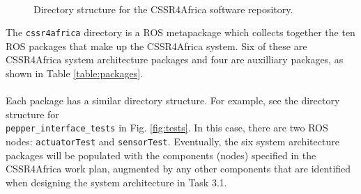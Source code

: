 \documentclass{CSSRforAfrica}
\newcommand{\blank}{~\\}
\begin{document}
\begin{appendices}
\begin{figure}[th]
\begin{multicols}{3}
\columnbreak

~~~~~~~~~~~~~~~~~~~~~

\end{multicols}
\caption{Directory structure for the CSSR4Africa software repository.}
\label{fig:directory_structure}       
\end{figure}

\noindent The {\small \verb+cssr4africa+} directory is a ROS metapackage which collects together the ten ROS packages that make up the CSSR4Africa system. Six of these are CSSR4Africa system architecture packages and four are auxilliary packages, as shown in Table \ref{table:packages}.
\blank
~
\blank
Each package has a similar directory structure. For example, see the directory structure for \\
{\small \verb+pepper_interface_tests+} in Fig. \ref{fig:tests}.  In this case, there are two ROS nodes: {\small \verb+actuatorTest+} and {\small \verb+sensorTest+}.  Eventually, the six system architecture packages will be populated with the components (nodes) specified in the CSSR4Africa work plan, augmented by any other components that are identified when designing the system architecture in Task 3.1.



\end{appendices}
\end{document}
